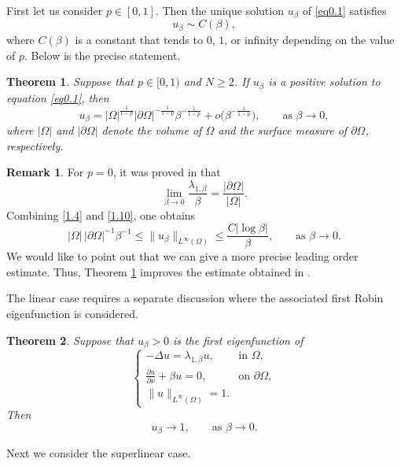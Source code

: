 \documentclass[12pt,reqno]{amsart}
\numberwithin{equation}{section}
\newtheorem{theorem}{Theorem}[section]
\theoremstyle{definition}
\newtheorem{remark}{Remark}
\begin{document}
First let us consider $p\in[0,1]$. Then the unique solution $u_\beta$ of \eqref{eq0.1} satisfies
$$
u_\beta\sim C(\beta),
$$
where $C(\beta)$ is a constant that tends to $0$, $1$, or infinity depending on the value of $p$.
Below is the precise statement.
\begin{theorem}\label{Theorem1.2}
Suppose that $p\in[0,1)$ and $N\ge2$. If $u_\beta$ is a positive solution to equation \eqref{eq0.1}, then
\[
u_\beta=
|\Omega|^{\frac{1}{1-p}}|\partial\Omega|^{-\frac{1}{1-p}}
\beta^{-\frac{1}{1-p}}
+o\bigl(\beta^{-\frac{1}{1-p}}\bigr),
\qquad \text{as }\beta\to0,
\]
where $|\Omega|$ and $|\partial\Omega|$ denote the volume of $\Omega$ and the surface measure of $\partial\Omega$, respectively.
\end{theorem}

\begin{remark}
For $p=0$, it was proved in \cite{GS} that
\begin{equation}\label{1.10}
\lim_{\beta\to0}\frac{\lambda_{1,\beta}}{\beta}=\frac{|\partial\Omega|}{|\Omega|}.
\end{equation}
Combining \eqref{1.4} and \eqref{1.10}, one obtains
\[
|\Omega|\,|\partial\Omega|^{-1}\beta^{-1}
\le \|u_\beta\|_{L^\infty(\Omega)}
\le \frac{C|\log\beta|}{\beta},
\qquad \text{as }\beta\to0.
\]
We would like to point out that we can give a more precise leading order estimate.
Thus, Theorem \ref{Theorem1.2} improves the estimate obtained in \cite{vB}.
\end{remark}

The linear case requires a separate discussion where the associated first Robin eigenfunction is considered.

\begin{theorem}\label{Theorem1.3}
Suppose that $u_\beta>0$ is the first eigenfunction of
\begin{equation*}
\begin{cases}
-\Delta u=\lambda_{1,\beta}u,\quad &\text{in }\Omega,\\
\frac{\partial u}{\partial \nu}+\beta u=0,\quad &\text{on }\partial\Omega,\\
\|u\|_{L^\infty(\Omega)}=1.
\end{cases}
\end{equation*}
Then
\[
u_\beta\to1,
\qquad \text{as }\beta\to0.
\]
\end{theorem}

Next we consider the superlinear case.
\end{document}
